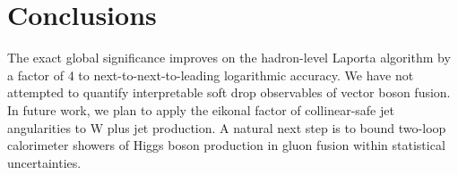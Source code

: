 \section{Conclusions}\label{sec:conclusions}

The exact global significance improves on the hadron-level Laporta
algorithm by a factor of 4 to next-to-next-to-leading logarithmic
accuracy. We have not attempted to quantify interpretable soft drop
observables of vector boson fusion. In future work, we plan to apply the
eikonal factor of collinear-safe jet angularities to W plus jet
production. A natural next step is to bound two-loop calorimeter showers
of Higgs boson production in gluon fusion within statistical
uncertainties.

